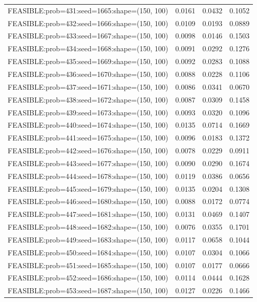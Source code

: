 \begin{longtable}{lccc}
FEASIBLE:prob=431:seed=1665:shape=(150, 100) & 0.0161 & 0.0432 & 0.1052 \\
FEASIBLE:prob=432:seed=1666:shape=(150, 100) & 0.0109 & 0.0193 & 0.0889 \\
FEASIBLE:prob=433:seed=1667:shape=(150, 100) & 0.0098 & 0.0146 & 0.1503 \\
FEASIBLE:prob=434:seed=1668:shape=(150, 100) & 0.0091 & 0.0292 & 0.1276 \\
FEASIBLE:prob=435:seed=1669:shape=(150, 100) & 0.0092 & 0.0283 & 0.1088 \\
FEASIBLE:prob=436:seed=1670:shape=(150, 100) & 0.0088 & 0.0228 & 0.1106 \\
FEASIBLE:prob=437:seed=1671:shape=(150, 100) & 0.0086 & 0.0341 & 0.0670 \\
FEASIBLE:prob=438:seed=1672:shape=(150, 100) & 0.0087 & 0.0309 & 0.1458 \\
FEASIBLE:prob=439:seed=1673:shape=(150, 100) & 0.0093 & 0.0320 & 0.1096 \\
FEASIBLE:prob=440:seed=1674:shape=(150, 100) & 0.0135 & 0.0714 & 0.1669 \\
FEASIBLE:prob=441:seed=1675:shape=(150, 100) & 0.0096 & 0.0183 & 0.1372 \\
FEASIBLE:prob=442:seed=1676:shape=(150, 100) & 0.0078 & 0.0229 & 0.0911 \\
FEASIBLE:prob=443:seed=1677:shape=(150, 100) & 0.0090 & 0.0290 & 0.1674 \\
FEASIBLE:prob=444:seed=1678:shape=(150, 100) & 0.0119 & 0.0386 & 0.0656 \\
FEASIBLE:prob=445:seed=1679:shape=(150, 100) & 0.0135 & 0.0204 & 0.1308 \\
FEASIBLE:prob=446:seed=1680:shape=(150, 100) & 0.0088 & 0.0172 & 0.0774 \\
FEASIBLE:prob=447:seed=1681:shape=(150, 100) & 0.0131 & 0.0469 & 0.1407 \\
FEASIBLE:prob=448:seed=1682:shape=(150, 100) & 0.0076 & 0.0355 & 0.1701 \\
FEASIBLE:prob=449:seed=1683:shape=(150, 100) & 0.0117 & 0.0658 & 0.1044 \\
FEASIBLE:prob=450:seed=1684:shape=(150, 100) & 0.0107 & 0.0304 & 0.1066 \\
FEASIBLE:prob=451:seed=1685:shape=(150, 100) & 0.0107 & 0.0177 & 0.0666 \\
FEASIBLE:prob=452:seed=1686:shape=(150, 100) & 0.0114 & 0.0444 & 0.1628 \\
FEASIBLE:prob=453:seed=1687:shape=(150, 100) & 0.0127 & 0.0226 & 0.1466 \\

\end{longtable}

